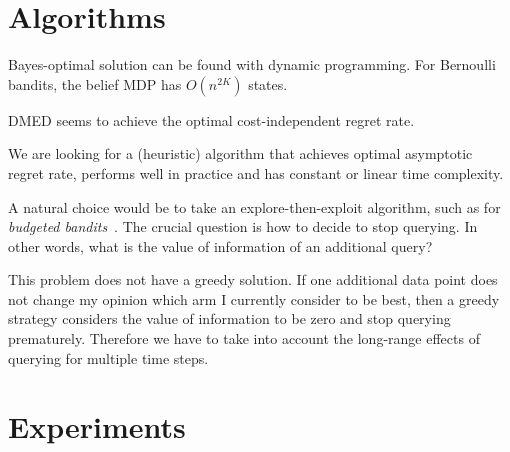 \documentclass[a4paper]{article}
\begin{document}
\section{Algorithms}

Bayes-optimal solution can be found with dynamic programming.
For Bernoulli bandits, the belief MDP has $O(n^{2K})$ states.

DMED seems to achieve the optimal cost-independent regret rate.

We are looking for a (heuristic) algorithm that achieves optimal asymptotic regret rate, performs well in practice and has constant or linear time complexity.

A natural choice would be to take an explore-then-exploit algorithm, such as for \emph{budgeted bandits}~\citep{...}.
The crucial question is how to decide to stop querying.
In other words, what is the value of information of an additional query?

This problem does not have a greedy solution.
If one additional data point does not change my opinion
which arm I currently consider to be best,
then a greedy strategy considers the value of information to be zero and stop querying prematurely.
Therefore we have to take into account the long-range effects of querying for multiple time steps.


\section{Experiments}

\iffalse
Algorithms:
* vanilla DMED (with commitment when 1 arm is selected?)
* partial monitoring algorithm (?)
* optimal stopping time (optimized problem-dependent)
* heuristic (with optimized alpha)

Problems:
* medium query cost c = 2 (>> gap)
  * horizon n = 10k vs gap 0.1 (< n^2/3)
  * horizon n = 1k vs gap 0.1 (~ n^2/3)
  * horizon n = 10k vs gap 0.01 (don't identify the arms)
* high query cost c = 50
  * horizon n = 10k vs gap 0.3 (pay to identify)
  * horizon n = 10k vs gap 0.1 (borderline case)
  * horizon n = 10k vs gap 0.05 (do not pay to identify)
* low query cost c = 0.01 (c << gap)
  * horizon n = 10k vs gap 0.1 (should almost always find the best arm)
  * horizon n = 200 vs gap 0.1 (query all the way?)
\fi
\end{document}
